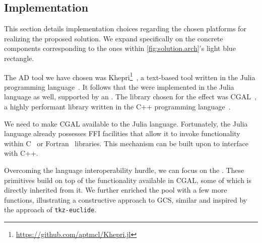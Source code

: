 \subsection{Implementation}%
\label{sec:solution.impl}

This section details implementation choices regarding the chosen platforms for
realizing the proposed solution.  We expand specifically on the concrete
components corresponding to the ones within \cref{fig:solution.arch}'s light
blue rectangle.

The \ac{AD} tool we have chosen was
Khepri\footnote{\url{https://github.com/aptmcl/Khepri.jl}}~\cite{Leitao:2019:GRUGEAV},
a text-based tool written in the Julia programming
language~\cite{Bezanson:2017:JAFANC}.  It follows that the \primitives{} were
implemented in the Julia language as well, supported by an \geomlibrary{}.  The
library chosen for the effect was \ac{CGAL}~\cite{CGAL:5.3:Project}, a highly
performant library written in the C++ programming
language~\cite{Stroustrup:2013:CPP}.

We need to make \ac{CGAL} available to the Julia language.  Fortunately, the
Julia language already possesses \ac{FFI} facilities that allow it to invoke
functionality within C~\cite{Kernighan:1988:C} or
Fortran~\cite{Backus:1957:Fortran} libraries.  This mechanism can be built upon
to interface with C++.

Overcoming the language interoperability hurdle, we can focus on the
\primitives{}.  These primitives build on top of the functionality available in
\ac{CGAL}, some of which is directly inherited from it.  We further enriched the
pool with a few more functions, illustrating a constructive approach to
\ac{GCS}, similar and inspired by the approach of \texttt{tkz-euclide}.




